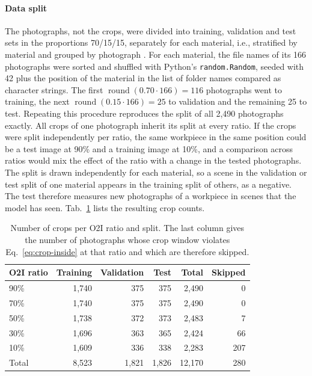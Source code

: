 \paragraph{Data split}
\label{sec:methodology-split}
The photographs, not the crops, were divided into training, validation and test sets
in the proportions 70/15/15, separately for each material, i.e., stratified by
material \citep{kohavi1995study} and grouped by photograph \citep{roberts2017cross}. For each material, the file names of its 166 photographs
were sorted and shuffled with Python's \texttt{random.Random}, seeded with 42 plus the
position of the material in the list of folder names compared as character strings.
The first $\operatorname{round}(0.70 \cdot 166) = 116$ photographs went to training,
the next $\operatorname{round}(0.15 \cdot 166) = 25$ to validation and the remaining 25
to test. Repeating this
procedure reproduces the split of all 2,490 photographs exactly. All crops of
one photograph inherit its split at every ratio. If the crops were split independently
per ratio, the same workpiece in the same position could be a test image at 90\% and a
training image at 10\%, and a comparison across ratios would mix the effect of the
ratio with a change in the tested photographs. The split is drawn independently for each
material, so a scene in the validation or test split of one material appears in the
training split of others, as a negative. The test therefore measures new photographs of a
workpiece in scenes that the model has seen. Tab.~\ref{tab:crop-counts} lists the
resulting crop counts.

\begin{table}[htbp]
\centering
\caption[Crop counts per ratio and split]{Number of crops per O2I ratio and split. The
last column gives the number of photographs whose crop window violates
Eq.~\eqref{eq:crop-inside} at that ratio and which are therefore skipped.}
\label{tab:crop-counts}
\begin{tabular}{lrrrrr}
\toprule
O2I ratio & Training & Validation & Test &
Total & Skipped \\
\midrule
90\% & 1,740 & 375 & 375 & 2,490 & 0 \\
70\% & 1,740 & 375 & 375 & 2,490 & 0 \\
50\% & 1,738 & 372 & 373 & 2,483 & 7 \\
30\% & 1,696 & 363 & 365 & 2,424 & 66 \\
10\% & 1,609 & 336 & 338 & 2,283 & 207 \\
\midrule
Total & 8,523 & 1,821 & 1,826 & 12,170 & 280 \\
\bottomrule
\end{tabular}
\end{table}

